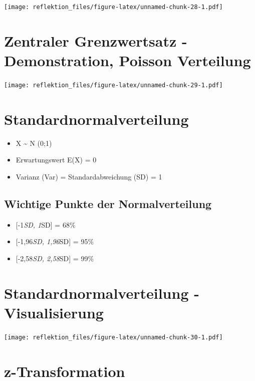 \documentclass[
]{book}
\providecommand{\tightlist}{%
  \setlength{\itemsep}{0pt}\setlength{\parskip}{0pt}}
\begin{document}
\texttt{[image: reflektion\_files/figure-latex/unnamed-chunk-28-1.pdf]}

\hypertarget{zentraler-grenzwertsatz---demonstration-poisson-verteilung}{%
\section{Zentraler Grenzwertsatz - Demonstration, Poisson Verteilung}\label{zentraler-grenzwertsatz---demonstration-poisson-verteilung}}

\texttt{[image: reflektion\_files/figure-latex/unnamed-chunk-29-1.pdf]}

\hypertarget{standardnormalverteilung}{%
\section{Standardnormalverteilung}\label{standardnormalverteilung}}

\begin{itemize}
\tightlist
\item
  X \textasciitilde{} N (0;1)
\item
  Erwartungswert E(X) = 0
\item
  Varianz (Var) = Standardabweichung (SD) = 1
\end{itemize}

\hypertarget{wichtige-punkte-der-normalverteilung}{%
\subsection{Wichtige Punkte der Normalverteilung}\label{wichtige-punkte-der-normalverteilung}}

\begin{itemize}
\tightlist
\item
  {[}-1\emph{SD, 1}SD{]} = 68\%
\item
  {[}-1,96\emph{SD, 1,96}SD{]} = 95\%
\item
  {[}-2,58\emph{SD, 2,58}SD{]} = 99\%
\end{itemize}

\hypertarget{standardnormalverteilung---visualisierung}{%
\section{Standardnormalverteilung - Visualisierung}\label{standardnormalverteilung---visualisierung}}

\texttt{[image: reflektion\_files/figure-latex/unnamed-chunk-30-1.pdf]}

\hypertarget{z-transformation}{%
\section{z-Transformation}\label{z-transformation}}
\end{document}
